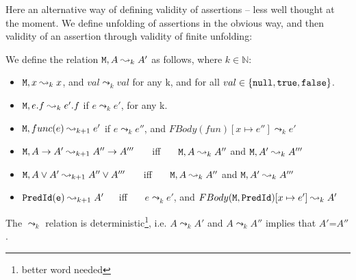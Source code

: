 \documentclass[acmsmall,screen]{acmart}
\begin{document}
Here an alternative way of defining validity of assertions -- less well thought at the moment.
We define unfolding of assertions in the obvious way, and  then validity of an assertion through validity of finite unfolding:

\begin{definition}
\label{def:unfold}
 We define the relation ${\mbox{\tt{M}}}, A \leadsto_k A'$ as follows, where $k\in \mathbb{N}$:

\noindent
 \begin{itemize}
\item
${\mbox{\tt{M}}}, x \leadsto_k x$,  and $val \leadsto_k val$  for any k, and for all $val\in\{ {\mbox{\tt{null}}}, {\mbox{\tt{true}}}, {\mbox{\tt{false}}} \}$.
\item
${\mbox{\tt{M}}}, e.f \leadsto_k e'.f$ if $e \leadsto_k e'$, for any k.
\item
${\mbox{\tt{M}}}, func(e) \leadsto_{k+1} e'$ if $e \leadsto_k e''$,  and $FBody(fun)[x \mapsto e'']   \leadsto_k e'$
\item
${\mbox{\tt{M}}},  A \rightarrow A' \leadsto_{k+1} A'' \rightarrow A'''$  \ \ \  iff \ \ \   $ {\mbox{\tt{M}}}, A  \leadsto_{k}  A''$ and $ {\mbox{\tt{M}}}, A'  \leadsto_{k} A'''$
\item
$ {\mbox{\tt{M}}}, A \vee A' \leadsto_{k+1} A'' \vee A'''$  \ \ \  iff \ \ \   $ {\mbox{\tt{M}}}, A  \leadsto_{k}  A''$ and ${\mbox{\tt{M}}},  A'  \leadsto_{k} A'''$
\item
$  {{\mbox{\tt{PredId}}}({\mbox{\tt{e}}})} \leadsto_{k+1} A'$\ \ \  iff \ \ \   $e \leadsto_k e'$,  and $FBody({\mbox{\tt{M}}}, {\mbox{\tt{PredId}}})[x \mapsto e']   \leadsto_k A'$\end{itemize}


\end{definition}

The $\leadsto_k$ relation is deterministic\footnote{better word needed}, i.e. $A \leadsto_k A'$ and $A \leadsto_k A''$ implies that $A'$=$A''$.
\end{document}
